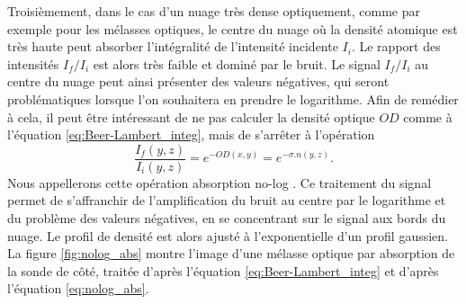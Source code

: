 Troisièmement, %
dans le cas d'un nuage très dense optiquement, comme par exemple pour les mélasses optiques, le centre du nuage où la densité atomique est très haute peut absorber l'intégralité de l'intensité incidente $I_i$.
Le rapport des intensités $I_f/I_i$ est alors très faible et dominé par le bruit.
Le signal $I_f/I_i$ au centre du nuage peut ainsi présenter des valeurs négatives, qui seront problématiques lorsque l'on souhaitera en prendre le logarithme.
Afin de remédier à cela, il peut être intéressant de ne pas calculer la densité optique $OD$ comme à l'équation \eqref{eq:Beer-Lambert_integ}, mais de s'arrêter à l'opération 
\begin{equation}
\label{eq:nolog_abs}
\frac{I_f(y,z)}{I_i(y,z)} = e^{-OD(x,y)} = e^{-\sigma .n(y,z)}.
\end{equation}
Nous appellerons cette opération \og absorption no-log \fg{}.
Ce traitement du signal permet de s'affranchir de \og l'amplification \fg{} du bruit au centre par le logarithme et du problème des valeurs négatives, en se concentrant sur le signal aux bords du nuage.
Le profil de densité est alors ajusté à l'exponentielle d'un profil gaussien.
La figure \eqref{fig:nolog_abs} montre l'image d'une mélasse optique par absorption de la sonde de côté, traitée d'après l'équation \eqref{eq:Beer-Lambert_integ} et d'après l'équation \eqref{eq:nolog_abs}.

